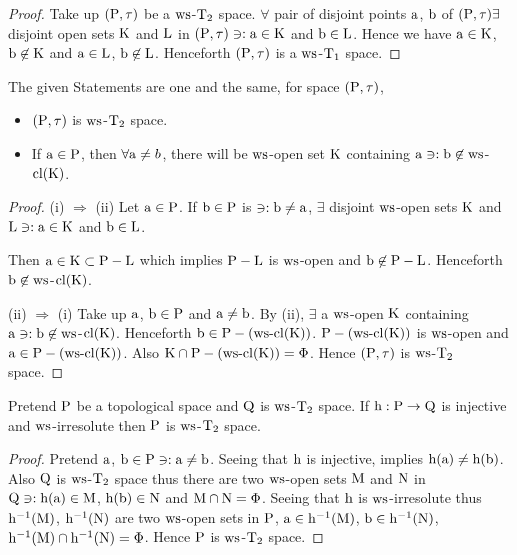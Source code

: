 \begin{proof}
Take up $(\mathrm{P}, \tau)$ be a $\mathrm{ws}$-$\mathrm{T}_{2}$ space. $\forall$ pair of disjoint points $\mathrm{a}$, $\mathrm{b}$ of $(\mathrm{P}, \tau) \exists$ disjoint open sets $\mathrm{K}$ and $\mathrm{L}$ in $(\mathrm{P}, \tau) \ni: \mathrm{a} \in \mathrm{K}$ and $\mathrm{b} \in \mathrm{L}$. Hence we have $\mathrm{a} \in \mathrm{K}$, $\mathrm{b} \not\in \mathrm{K}$ and $\mathrm{a} \in \mathrm{L}$, $\mathrm{b} \not\in \mathrm{L}$. Henceforth $(\mathrm{P}, \tau)$ is a $\mathrm{ws}$-$\mathrm{T}_{1}$ space.
\end{proof}

\begin{thm}\label{thm8.2.18}
The given Statements are one and the same, for space $(\mathrm{P}, \tau)$,
\begin{itemize}
\item[(i)] $(\mathrm{P}, \tau)$ is $\mathrm{ws}$-$\mathrm{T}_{2}$ space.
\item[(ii)] If $\mathrm{a} \in \mathrm{P}$, then $\forall \mathrm{a}\neq b$, there will be $\mathrm{ws}$-open set $\mathrm{K}$ containing $\mathrm{a} \ni: \mathrm{b} \not\in \mathrm{ws}$-$\mathrm{cl}(\mathrm{K})$.
\end{itemize}
\end{thm}

\begin{proof}
(i) $\Rightarrow$ (ii) Let $\mathrm{a} \in \mathrm{P}$. If $\mathrm{b} \in \mathrm{P}$ is $\ni: \mathrm{b} \neq \mathrm{a}$, $\exists$ disjoint $\mathrm{ws}$-open sets $\mathrm{K}$ and $\mathrm{L} \ni: \mathrm{a}\in \mathrm{K}$ and $\mathrm{b}\in \mathrm{L}$.

Then $\mathrm{a} \in \mathrm{K} \subset \mathrm{P}-\mathrm{L}$ which implies $\mathrm{P}-\mathrm{L}$ is $\mathrm{ws}$-open and $\mathrm{b} \not\in \mathrm{P}-\mathrm{L}$. Henceforth $\mathrm{b} \not\in \mathrm{ws}$-$\mathrm{cl}(\mathrm{K})$.

(ii) $\Rightarrow$ (i) Take up $\mathrm{a}$, $\mathrm{b} \in \mathrm{P}$ and $\mathrm{a} \neq\mathrm{b}$. By (ii), $\exists$ a $\mathrm{ws}$-open $\mathrm{K}$ containing $\mathrm{a} \ni: \mathrm{b} \not\in \mathrm{ws}$-$\mathrm{cl}(\mathrm{K})$. Henceforth $\mathrm{b}\in \mathrm{P}-(\mathrm{ws}\text{-}\mathrm{cl}(\mathrm{K}))$. $\mathrm{P}-(\mathrm{ws}\text{-}\mathrm{cl}(\mathrm{K}))$ is $\mathrm{ws}$-open and $\mathrm{a} \in \mathrm{P}- (\mathrm{ws}\text{-}\mathrm{cl}(\mathrm{K}))$. Also $\mathrm{K}\cap\mathrm{P}-(\mathrm{ws}\text{-}\mathrm{cl}(\mathrm{K})) = \Phi$. Hence $(\mathrm{P}, \tau)$ is $\mathrm{ws}$-$\mathrm{T}_{2}$ space.
\end{proof}

\begin{thm}\label{thm8.2.19}
Pretend $\mathrm{P}$ be a topological space and $\mathrm{Q}$ is $\mathrm{ws}$-$\mathrm{T}_{2}$ space. If $\mathrm{h}: \mathrm{P} \to \mathrm{Q}$ is injective and $\mathrm{ws}$-irresolute then $\mathrm{P}$ is $\mathrm{ws}$-$\mathrm{T}_{2}$ space.
\end{thm}

\begin{proof}
Pretend $\mathrm{a}$, $\mathrm{b} \in \mathrm{P} \ni: \mathrm{a} \neq \mathrm{b}$. Seeing that $\mathrm{h}$ is injective, implies $\mathrm{h}(\mathrm{a}) \neq \mathrm{h}(\mathrm{b})$. Also $\mathrm{Q}$ is $\mathrm{ws}$-$\mathrm{T}_{2}$ space thus there are two $\mathrm{ws}$-open sets $\mathrm{M}$ and $\mathrm{N}$ in $\mathrm{Q} \ni: \mathrm{h}(\mathrm{a}) \in \mathrm{M}$, $\mathrm{h}(\mathrm{b}) \in \mathrm{N}$ and $\mathrm{M}\cap \mathrm{N}=\Phi$. Seeing that $\mathrm{h}$ is $\mathrm{ws}$-irresolute thus $\mathrm{h}^{-1}(\mathrm{M})$, $\mathrm{h}^{-1} (\mathrm{N})$ are two $\mathrm{ws}$-open sets in $\mathrm{P}$, $\mathrm{a} \in \mathrm{h}^{-1} (\mathrm{M})$, $\mathrm{b} \in \mathrm{h}^{-1} (\mathrm{N})$, $\mathrm{h}^{-1} (\mathrm{M}) \cap \mathrm{h}^{-1} (\mathrm{N}) = \Phi$. Hence $\mathrm{P}$ is $\mathrm{ws}$-$\mathrm{T}_{2}$ space.
\end{proof}

